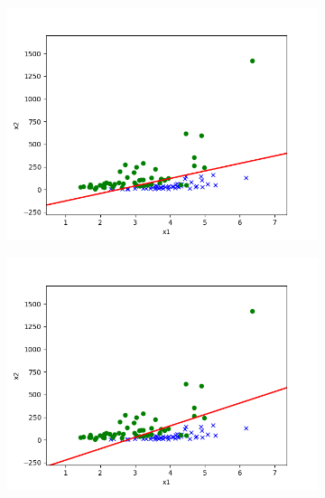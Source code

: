 \begin{answer}
\begin{figure}[htbp]
    \begin{subfigure}[b]{0.5\linewidth}
        \centering
        \includegraphics[width=\linewidth]{pics/p01b_pred_1.txt.png}
    \end{subfigure}
    \begin{subfigure}[b]{0.5\linewidth}
        \centering
        \includegraphics[width=\linewidth]{pics/p01e_pred_1.txt.png}
    \end{subfigure}

\end{figure}

\end{answer}